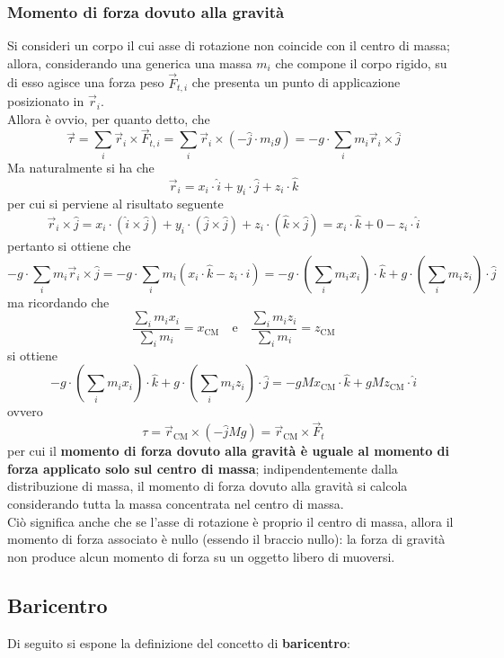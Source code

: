 \documentclass[a4paper]{extarticle}
\begin{document}
\subsubsection{Momento di forza dovuto alla gravità}
Si consideri un corpo il cui asse di rotazione non coincide con il centro di massa; allora, considerando una generica una massa $m_i$ che compone il corpo rigido, su di esso agisce una forza peso $\vec F_{t,i}$ che presenta un punto di applicazione posizionato in $\vec r_i$.\\
Allora è ovvio, per quanto detto, che
\[\vec \tau = \sum_i \vec r_i \times \vec F_{t,i} = \sum_i \vec r_i \times (-\hat{j} \cdot m_i g) = -g \cdot \sum_i m_i \vec r_i \times \hat{j}\]
Ma naturalmente si ha che
\[\vec r_i = x_i \cdot \hat{i} + y_i \cdot \hat{j} + z_i \cdot \hat{k}\]
per cui si perviene al risultato seguente
\[\vec r_i \times \hat{j} = x_i \cdot (\hat{i} \times \hat{j}) + y_i \cdot (\hat{j} \times \hat{j}) + z_i \cdot (\hat{k} \times \hat{j}) = x_i \cdot \hat{k} + 0 - z_i \cdot \hat{i}\]
pertanto si ottiene che
\[-g \cdot \sum_i m_i \vec r_i \times \hat{j} = -g \cdot \sum_i m_i \left(x_i \cdot \hat{k} - z_i \cdot \hat{i}\right) = -g \cdot \left(\sum_i m_i x_i\right) \cdot \hat{k} + g \cdot \left(\sum_i m_i z_i\right) \cdot \hat{j}\]
ma ricordando che
\[\frac{\displaystyle{\sum_i m_i x_i}}{\displaystyle{\sum_i m_i}} = x_{\text{CM}} \hspace{1em} \text{e} \hspace{1em} \frac{\displaystyle{\sum_i m_i z_i}}{\displaystyle{\sum_i m_i}} = z_{\text{CM}}\]
si ottiene
\[-g \cdot \left(\sum_i m_i x_i\right) \cdot \hat{k} + g \cdot \left(\sum_i m_i z_i\right) \cdot \hat{j} = -g M x_{\text{CM}} \cdot \hat{k} + g M z_{\text{CM}} \cdot \hat{i}\]
ovvero
\[\boxed{\tau=\vec r_{\text{CM}} \times \left(- \hat{j} M g\right) = \vec r_{\text{CM}} \times \vec F_{t}}\]
per cui il \textbf{momento di forza dovuto alla gravità è uguale al momento di forza applicato solo sul centro di massa}; indipendentemente dalla distribuzione di massa, il momento di forza dovuto alla gravità si calcola considerando tutta la massa concentrata nel centro di massa.\\
Ciò significa anche che se l'asse di rotazione è proprio il centro di massa, allora il momento di forza associato è nullo (essendo il braccio nullo): la forza di gravità non produce alcun momento di forza su un oggetto libero di muoversi.

\vspace{1em}
\subsection{Baricentro}
Di seguito si espone la definizione del concetto di \textbf{baricentro}:
\end{document}
